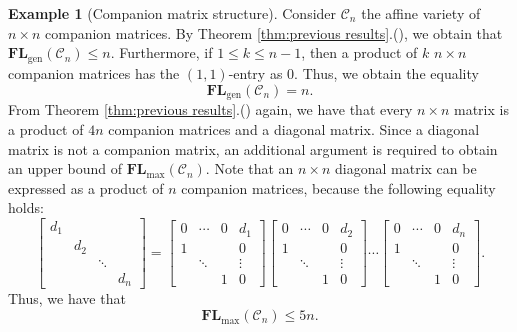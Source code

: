 \documentclass[reqno]{amsart}
\theoremstyle{definition}
\newtheorem{example}[theorem]{Example}
\numberwithin{equation}{section}
\begin{document}
\begin{example}[Companion matrix structure]\label{ex:companion matrix structure}
    Consider $\mathcal{C}_n$ the affine variety of $n \times n$ companion matrices. By Theorem \ref{thm:previous results}.(), we obtain that $\mathbf{FL}_{\text{gen}}(\mathcal{C}_n) \leq n$. Furthermore, if $1 \leq k \leq n-1$, then a product of $k$ $n\times n$ companion matrices has the $(1,1)$-entry as $0$. Thus, we obtain the equality
    \begin{equation*}
        \mathbf{FL}_{\text{gen}}(\mathcal{C}_n) = n.
    \end{equation*}
    From Theorem \ref{thm:previous results}.() again, we have that every $n \times n$ matrix is a product of $4n$ companion matrices and a diagonal matrix. Since a diagonal matrix is not a companion matrix, an additional argument is required to obtain an upper bound of $\mathbf{FL}_{\text{max}}(\mathcal{C}_n)$. Note that an $n \times n$ diagonal matrix can be expressed as a product of $n$ companion matrices, because the following equality holds:
    \begin{equation*}
        \begin{bmatrix}
            d_1 & & & \\
            & d_2 & & \\
             & & \ddots & \\
             & & & d_n
        \end{bmatrix}=\begin{bmatrix}
            0 &\cdots & 0 & d_1\\
            1 &  &  & 0\\
             & \ddots &  & \vdots \\
             & &  1 & 0
        \end{bmatrix}\begin{bmatrix}
            0 &\cdots & 0 & d_2\\
            1 &  &  & 0\\
             & \ddots &  & \vdots \\
             & &  1 & 0
        \end{bmatrix}\cdots \begin{bmatrix}
            0 &\cdots & 0 & d_n\\
            1 &  &  & 0\\
             & \ddots &  & \vdots \\
             & &  1 & 0
        \end{bmatrix}.
    \end{equation*}
    Thus, we have that
    \begin{equation*}
        \mathbf{FL}_{\text{max}}(\mathcal{C}_n) \leq 5n.
    \end{equation*}


\end{example}
\end{document}
